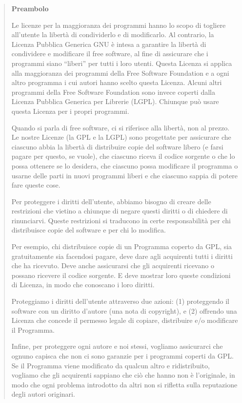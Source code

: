 \begin{quote}
  \begin{center} \textbf{Preambolo} \end{center}

  Le licenze per la maggioranza dei programmi hanno lo scopo
  di togliere all'utente la libert\`a di condividerlo e di
  modificarlo. Al contrario, la Licenza Pubblica Generica
  GNU \`e intesa a garantire la libert\`a di condividere e
  modificare il free software, al fine di assicurare che i
  programmi siano ``liberi'' per tutti i loro utenti. Questa
  Licenza si applica alla maggioranza dei programmi della
  Free Software Foundation e a ogni altro programma i cui
  autori hanno scelto questa Licenza. Alcuni altri programmi
  della Free Software Foundation sono invece coperti dalla
  Licenza Pubblica Generica per Librerie (LGPL). Chiunque
  pu\`o usare questa Licenza per i propri programmi.

  Quando si parla di free software, ci si riferisce alla
  libert\`a, non al prezzo. Le nostre Licenze (la GPL e la
  LGPL) sono progettate per assicurare che ciascuno abbia la
  libert\`a di distribuire copie del software libero (e
  farsi pagare per questo, se vuole), che ciascuno riceva il
  codice sorgente o che lo possa ottenere se lo desidera,
  che ciascuno possa modificare il programma o usarne delle
  parti in nuovi programmi liberi e che ciascuno sappia di
  potere fare queste cose.

  Per proteggere i diritti dell'utente, abbiamo bisogno di
  creare delle restrizioni che vietino a chiunque di negare
  questi diritti o di chiedere di rinunciarvi. Queste
  restrizioni si traducono in certe responsabilit\`a per chi
  distribuisce copie del software e per chi lo modifica.

  Per esempio, chi distribuisce copie di un Programma
  coperto da GPL, sia gratuitamente sia facendosi pagare,
  deve dare agli acquirenti tutti i diritti che ha ricevuto.
  Deve anche assicurarsi che gli acquirenti ricevano o
  possano ricevere il codice sorgente. E deve mostrar loro
  queste condizioni di Licenza, in modo che conoscano i loro
  diritti.

  Proteggiamo i diritti dell'utente attraverso due azioni:
  (1) proteggendo il software con un diritto d'autore (una
  nota di copyright), e (2) offrendo una Licenza che concede
  il permesso legale di copiare, distribuire e/o modificare
  il Programma.

  Infine, per proteggere ogni autore e noi stessi, vogliamo
  assicurarci che ognuno capisca che non ci sono garanzie
  per i programmi coperti da GPL. Se il Programma viene
  modificato da qualcun altro e ridistribuito, vogliamo che
  gli acquirenti sappiano che ci\`o che hanno non \`e
  l'originale, in modo che ogni problema introdotto da altri
  non si rifletta sulla reputazione degli autori originari.


\end{quote}
